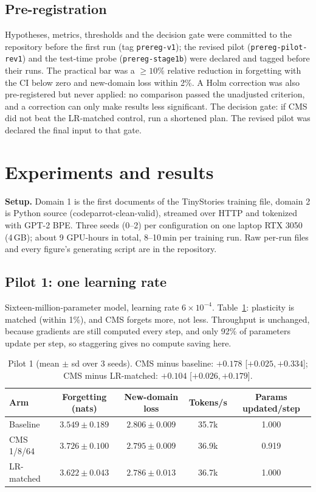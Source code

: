 \documentclass[10pt]{article}
\begin{document}
\subsection{Pre-registration}
Hypotheses, metrics, thresholds and the decision gate were committed to the repository before the first run (tag \texttt{prereg-v1}); the revised
pilot (\texttt{prereg-pilot-rev1}) and the test-time probe (\texttt{prereg-stage1b}) were declared and tagged before their runs. The practical bar was a
$\geq10\%$ relative reduction in forgetting with the CI below zero and new-domain loss within 2\%. A Holm correction was also pre-registered but never applied: no comparison passed the
unadjusted criterion, and a correction can only make results less significant.
The decision gate: if CMS did not beat the LR-matched control, run a shortened plan. The revised pilot
was declared the final input to that gate.

\section{Experiments and results}
\textbf{Setup.} Domain 1 is the first documents of the TinyStories training file, domain 2 is Python source (codeparrot-clean-valid), streamed over
HTTP and tokenized with GPT-2 BPE. Three seeds (0--2) per configuration on one laptop RTX 3050 (4\,GB); about 9 GPU-hours in total,
8--10\,min per training run. Raw per-run files and every figure's generating script are in the repository.

\subsection{Pilot 1: one learning rate}
Sixteen-million-parameter model, learning rate $6\times10^{-4}$. Table~\ref{tab:p1}: plasticity is matched (within 1\%), and CMS forgets more, not
less. Throughput is unchanged, because gradients are still computed every step, and only 92\% of parameters update per step, so staggering gives no compute saving here.

\begin{table}[h]\centering\small
\begin{tabular}{lcccc}\toprule
Arm & Forgetting (nats) & New-domain loss & Tokens/s & Params updated/step\\\midrule
Baseline & $3.549\pm0.189$ & $2.806\pm0.009$ & 35.7k & 1.000\\
CMS 1/8/64 & $3.726\pm0.100$ & $2.795\pm0.009$ & 36.9k & 0.919\\
LR-matched & $3.622\pm0.043$ & $2.786\pm0.013$ & 36.7k & 1.000\\\bottomrule
\end{tabular}
\caption{Pilot 1 (mean $\pm$ sd over 3 seeds). CMS minus baseline: $+0.178$ [$+0.025,+0.334$]; CMS minus LR-matched: $+0.104$ [$+0.026,+0.179$].}\label{tab:p1}
\end{table}
\end{document}
